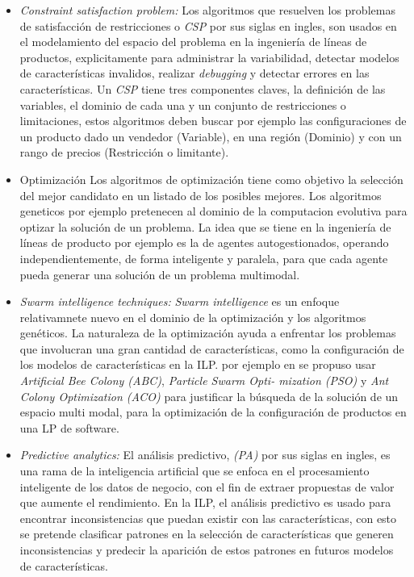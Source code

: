 \begin{itemize}
\begin{itemize}
	\item {\textit{Constraint satisfaction problem:}}
	Los algoritmos que resuelven los problemas de satisfacción de restricciones o \textit{CSP} por sus siglas en ingles, son usados en el modelamiento del espacio del problema en la ingeniería de líneas de productos, explicitamente para administrar la variabilidad, detectar modelos de características invalidos, realizar \textit{debugging} y detectar errores en las características. Un \textit{CSP} tiene tres componentes claves, la definición de las variables, el dominio de cada una y un conjunto de restricciones o limitaciones, estos algoritmos deben buscar por ejemplo las configuraciones de un producto dado un vendedor (Variable), en una región (Dominio) y con un rango de precios (Restricción o limitante).
	\item {Optimización}
	Los algoritmos de optimización tiene como objetivo la selección del mejor candidato en un listado de los posibles mejores. Los algoritmos geneticos por ejemplo pretenecen al dominio de la computacion evolutiva para optizar la solución de un problema. La idea que se tiene en la ingeniería de líneas de producto por ejemplo es la de agentes autogestionados, operando independientemente, de forma inteligente y paralela, para que cada agente pueda generar una solución de un problema multimodal.
	\item {\textit{Swarm intelligence techniques:}}
	\textit{Swarm intelligence} es un enfoque relativamnete nuevo en el dominio de la optimización y los algoritmos genéticos. La naturaleza de la optimización ayuda a enfrentar los problemas que involucran una gran cantidad de características, como la configuración de los modelos de características en la ILP. por ejemplo en \cite{Afzal2016} se propuso usar \textit{Artificial Bee Colony (ABC)}, \textit{Particle Swarm Opti- mization (PSO)} y \textit{Ant Colony Optimization (ACO)} para justificar la búsqueda de la solución de un espacio multi modal, para la optimización de la configuración de productos en una LP de software. 
	\item {\textit{Predictive analytics:}}
	El análisis predictivo, \textit{(PA)} por sus siglas en ingles, es una rama de la inteligencia artificial que se enfoca en el procesamiento inteligente de los datos de negocio, con el fin de extraer propuestas de valor que aumente el rendimiento. En la ILP, el análisis predictivo es  usado para encontrar inconsistencias que puedan existir con las características, con esto se pretende clasificar patrones en la selección de características que generen inconsistencias y predecir la aparición de estos patrones en futuros modelos de características.

\end{itemize}

\end{itemize}
	
